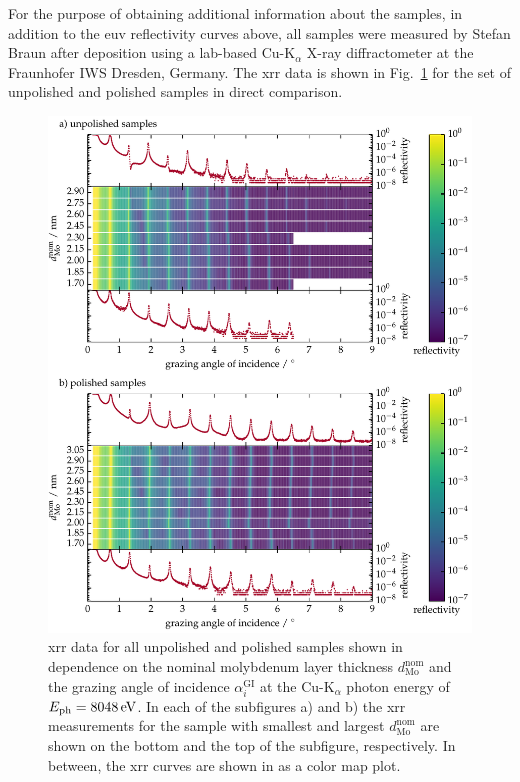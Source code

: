 For the purpose of obtaining additional information about the samples, in addition to the \gls{euv} reflectivity curves above, all samples were measured by Stefan Braun after deposition using a lab-based Cu-K$_\alpha$ X-ray diffractometer at the Fraunhofer IWS Dresden, Germany. The \gls{xrr} data is shown in Fig.~\ref{ch_spec:fig_MoSi_XRR} for the set of unpolished and polished samples in direct comparison.
\begin{figure}[htbp]
\centering
\includegraphics[width=\textwidth]{img/XRR_MoSi}
\caption[XRR data for all unpolished and polished Mo/Si/C samples.]{\gls{xrr} data for all unpolished and polished samples shown in dependence on the nominal molybdenum layer thickness $d_\text{Mo}^\text{nom}$ and the grazing angle of incidence $\alpha_i^\text{GI}$ at the Cu-K$_\alpha$ photon energy of $E_\text{ph} = \ev{8048}$. In each of the subfigures a) and b) the \gls{xrr} measurements for the sample with smallest and largest $d_\text{Mo}^\text{nom}$ are shown on the bottom and the top of the subfigure, respectively. In between, the \gls{xrr} curves are shown in as a color map plot.}
\label{ch_spec:fig_MoSi_XRR}
\end{figure}
